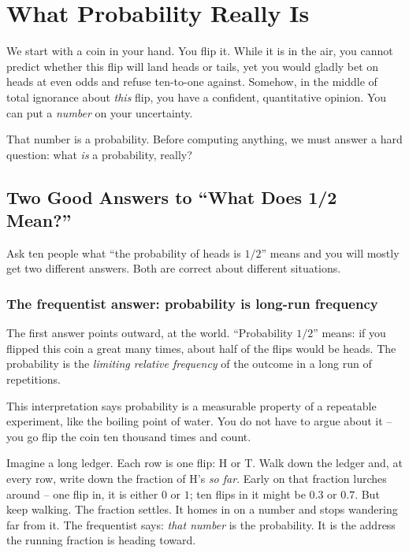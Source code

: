 \chapter{What Probability Really Is}

We start with a coin in your hand. You flip it. While it is in the air, you cannot predict whether this flip will land
heads or tails, yet you would gladly bet on heads at even odds and refuse ten-to-one
against. Somehow, in the middle of total ignorance about \emph{this} flip, you have a
confident, quantitative opinion. You can put a \emph{number} on your uncertainty.

That number is a probability. Before computing anything, we must answer a hard question: what \emph{is} a probability, really?

\section{Two Good Answers to ``What Does 1/2 Mean?''}
\label{ch01:two-answers}

Ask ten people what ``the probability of heads is $1/2$'' means and you will mostly get two different answers. Both are correct about different situations.

\subsection{The frequentist answer: probability is long-run frequency}
\label{ch01:frequentist}

The first answer points outward, at the world. ``Probability $1/2$'' means: if you
flipped this coin a great many times, about half of the flips would be heads. The
probability is the \emph{limiting relative frequency} of the outcome in a long
run of repetitions.

This interpretation says probability is a measurable
property of a repeatable experiment, like the boiling point of water. You do not
have to argue about it -- you go flip the coin ten thousand times and count.

\begin{intuitionbox}
Imagine a long ledger. Each row is one flip: H or T. Walk down the ledger and, at
every row, write down the fraction of H's \emph{so far}. Early on that fraction
lurches around -- one flip in, it is either $0$ or $1$; ten flips in it might be
$0.3$ or $0.7$. But keep walking. The fraction settles. It homes in on a number
and stops wandering far from it. The frequentist says: \emph{that number} is the
probability. It is the address the running fraction is heading toward.
\end{intuitionbox}

